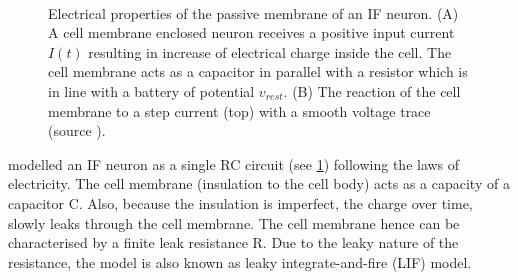\begin{figure}
	\centering
	\\
	
	\caption{Electrical properties of the passive membrane of an IF neuron. (A) A cell membrane enclosed neuron receives a positive input current $I(t)$ resulting in increase of electrical charge inside the cell. The cell membrane acts as a capacitor in parallel with a resistor which is in line with a battery of potential $v_{rest}$. (B) The reaction of the cell membrane to a step current (top) with a smooth voltage trace (source \citet{gerstner2014neuronal}).}
	\label{fig:if_neuron}
\end{figure}

\citet{gerstner2014neuronal} modelled an IF neuron as a single RC circuit (see \figurename \ref{fig:if_neuron}) following the laws of electricity. The cell membrane (insulation to the cell body) acts as a capacity of a capacitor C. Also, because the insulation is imperfect, the charge over time, slowly leaks through the cell membrane. The cell membrane hence can be characterised by a finite leak resistance R. Due to the leaky nature of the resistance, the model is also known as leaky integrate-and-fire (LIF) model.

